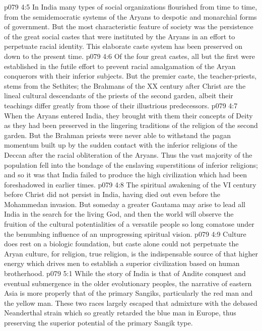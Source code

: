 \vs p079 4:5 In India many types of social organizations flourished from time to time, from the semidemocratic systems of the Aryans to despotic and monarchial forms of government. But the most characteristic feature of society was the persistence of the great social castes that were instituted by the Aryans in an effort to perpetuate racial identity. This elaborate caste system has been preserved on down to the present time.
\vs p079 4:6 Of the four great castes, all but the first were established in the futile effort to prevent racial amalgamation of the Aryan conquerors with their inferior subjects. But the premier caste, the teacher\hyp{}priests, stems from the Sethites; the Brahmans of the XX century after Christ are the lineal cultural descendants of the priests of the second garden, albeit their teachings differ greatly from those of their illustrious predecessors.
\vs p079 4:7 When the Aryans entered India, they brought with them their concepts of Deity as they had been preserved in the lingering traditions of the religion of the second garden. But the Brahman priests were never able to withstand the pagan momentum built up by the sudden contact with the inferior religions of the Deccan after the racial obliteration of the Aryans. Thus the vast majority of the population fell into the bondage of the enslaving superstitions of inferior religions; and so it was that India failed to produce the high civilization which had been foreshadowed in earlier times.
\vs p079 4:8 The spiritual awakening of the VI century before Christ did not persist in India, having died out even before the Mohammedan invasion. But someday a greater Gautama may arise to lead all India in the search for the living God, and then the world will observe the fruition of the cultural potentialities of a versatile people so long comatose under the benumbing influence of an unprogressing spiritual vision.
\vs p079 4:9 Culture does rest on a biologic foundation, but caste alone could not perpetuate the Aryan culture, for religion, true religion, is the indispensable source of that higher energy which drives men to establish a superior civilization based on human brotherhood.
\vs p079 5:1 While the story of India is that of Andite conquest and eventual submergence in the older evolutionary peoples, the narrative of eastern Asia is more properly that of the primary Sangiks, particularly the red man and the yellow man. These two races largely escaped that admixture with the debased Neanderthal strain which so greatly retarded the blue man in Europe, thus preserving the superior potential of the primary Sangik type.
